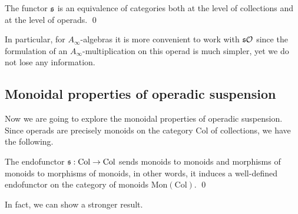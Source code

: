 \documentclass[Thesis.tex]{subfiles}
\begin{document}
\begin{propo}
The functor $\mathfrak{s}$ is an equivalence of categories both at the level of collections and at the level of operads. \qed %
\end{propo}
In particular, for $A_\infty$-algebras it is more convenient to work with $\mathfrak{s}{\mathcal O}$ since the formulation of an $A_\infty$-multiplication on this operad is much simpler, yet we do not lose any information.
\subsection{Monoidal properties of operadic suspension}\label{monoidalsusp}
Now we are going to explore the monoidal properties of operadic suspension. Since operads are precisely monoids on the category $\mathrm{Col}$ of collections, we have the following.
\begin{propo} %
The endofunctor $\mathfrak{s}:\mathrm{Col}\to\mathrm{Col}$ sends monoids to monoids and morphisms of monoids to morphisms of monoids, in other words, it induces a well-defined endofunctor on the category of monoids $\mathrm{Mon}(\mathrm{Col})$. \qed%
\end{propo}


In fact, we can show a stronger result.
\end{document}
